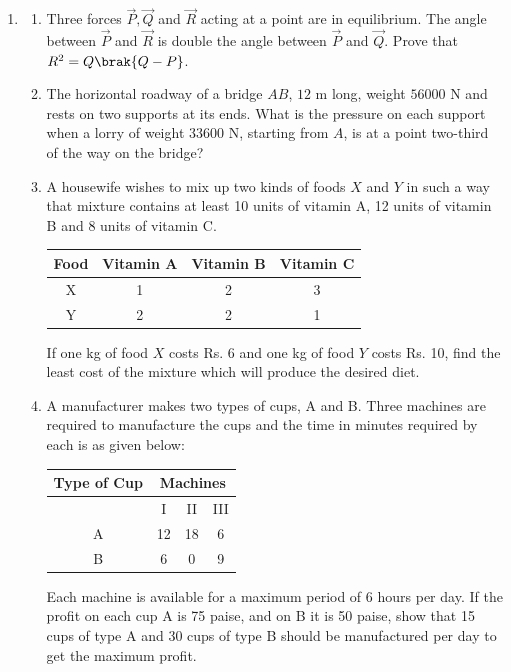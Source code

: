 \begin{enumerate}[label=\thesubsection.\arabic*, ref=\thesubsection.\theenumi]
	\item \hfill {}
	\begin{enumerate}[label=\brak{\alph*}]
		\item Three forces $\vec{P}, \vec{Q}$ and $\vec{R}$ acting at a point are in equilibrium. The angle between $\vec{P}$ and $\vec{R}$ is double the angle between $\vec{P}$ and $\vec{Q}$. Prove that $R^2 = Q\brak{Q-P}$.
		\item The horizontal roadway of a bridge $AB$, $12\text{ m}$ long, weight $56000\text{ N}$ and rests on two supports at its ends. What is the pressure on each support when a lorry of weight $33600\text{ N}$, starting from $A$, is at a point two-third of the way on the bridge?
		\item A housewife wishes to mix up two kinds of foods $X$ and $Y$ in such a way that mixture contains at least 10 units of vitamin A, 12 units of vitamin B and 8 units of vitamin C.
		\begin{center}
			\begin{tabular}{|c|c|c|c|}
				\hline
				Food & Vitamin A & Vitamin B & Vitamin C \\ \hline
				X & 1 & 2 & 3 \\
				Y & 2 & 2 & 1 \\ \hline
			\end{tabular}
		\end{center}
		If one kg of food $X$ costs Rs. 6 and one kg of food $Y$ costs Rs. 10, find the least cost of the mixture which will produce the desired diet.
		\item A manufacturer makes two types of cups, A and B. Three machines are required to manufacture the cups and the time in minutes required by each is as given below:
		\begin{center}
			\begin{tabular}{|c|c|c|c|}
				\hline
				Type of Cup & \multicolumn{3}{c|}{Machines} \\ \hline
				& I & II & III \\ \hline
				A & 12 & 18 & 6 \\
				B & 6 & 0 & 9 \\ \hline
			\end{tabular}
		\end{center}
		Each machine is available for a maximum period of 6 hours per day. If the profit on each cup A is 75 paise, and on B it is 50 paise, show that 15 cups of type A and 30 cups of type B should be manufactured per day to get the maximum profit.
	\end{enumerate}

\end{enumerate}

